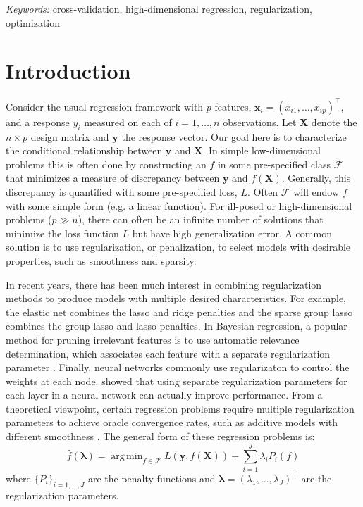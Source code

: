 \documentclass[12pt]{article}
\DeclareMathOperator*{\argmin}{arg\,min}
\begin{document}
\noindent%
{\it Keywords:}  cross-validation, high-dimensional regression, regularization, optimization
\vfill

\newpage
{}
\section{Introduction}
Consider the usual regression framework with $p$ features, $\boldsymbol x_i = (x_{i1},\ldots,x_{ip})^\top$, and a response $y_i$ measured on each of $i=1,\ldots,n$ observations. Let $\boldsymbol X$ denote the $n \times p$ design matrix and $\boldsymbol y$ the response vector. Our goal here is to characterize the conditional relationship between $\boldsymbol y$ and $\boldsymbol X$. In simple low-dimensional problems this is often done by constructing an $f$ in some pre-specified class $\mathcal{F}$ that minimizes a measure of discrepancy between $\boldsymbol y$ and $f(\boldsymbol X)$. Generally, this discrepancy is quantified with some pre-specified loss, $L$. Often $\mathcal{F}$ will endow $f$ with some simple form (e.g. a linear function). For ill-posed or high-dimensional problems ($p \gg n$), there can often be an infinite number of solutions that minimize the loss function $L$ but have high generalization error. A common solution is to use regularization, or penalization, to select models with desirable properties, such as smoothness and sparsity.

In recent years, there has been much interest in combining regularization methods to produce models with multiple desired characteristics. For example, the elastic net \citep{zou2003regression} combines the lasso and ridge penalties and the sparse group lasso \citep{simon2013sparse} combines the group lasso and lasso penalties. In Bayesian regression, a popular method for pruning irrelevant features is to use automatic relevance determination, which associates each feature with a separate regularization parameter \citep{neal1996bayesian}. Finally, neural networks commonly use regularizaton to control the weights at each node. \citet{snoek2012practical} showed that using separate regularization parameters for each layer in a neural network can actually improve performance. From a theoretical viewpoint, certain regression problems require multiple regularization parameters to achieve oracle convergence rates, such as additive models with different smoothness \citep{van2014additive}. The general form of these regression problems is:
\begin{equation} \label {eq:basic}
\hat f(\boldsymbol{\lambda}) = \argmin_{f\in\mathcal{F}} L\left (\boldsymbol{y}, f (\boldsymbol{X}) \right ) + \sum\limits_{i=1}^J \lambda_i P_i(f)
\end{equation}
where $\{P_i\}_{i=1, ..., J}$ are the penalty functions and $\boldsymbol{\lambda} = (\lambda_1, \ldots, \lambda_J)^\top$ are the regularization parameters. 
\end{document}
